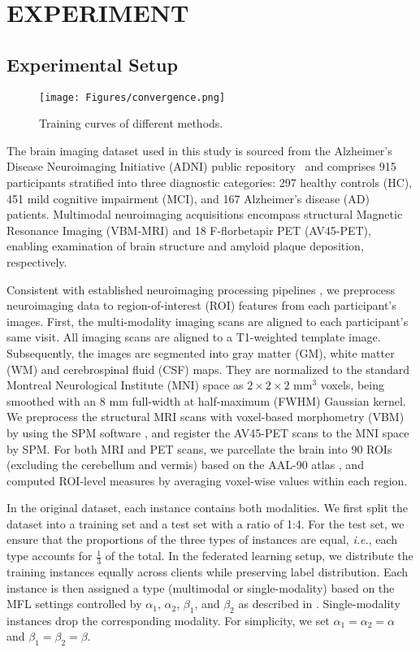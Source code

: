 \section{EXPERIMENT}
\subsection{Experimental Setup}

\begin{figure*}[h]
    \centering
    \texttt{[image: Figures/convergence.png]}
    \caption{Training curves of different methods.}
    \label{fig:training curve}
\end{figure*}
The brain imaging dataset used in this study is sourced from the Alzheimer's Disease Neuroimaging Initiative (ADNI) public repository~\cite{mueller2005alzheimer} and comprises 915 participants stratified into three diagnostic categories: 297 healthy controls (HC), 451 mild cognitive impairment (MCI), and 167 Alzheimer's disease (AD) patients. Multimodal neuroimaging acquisitions encompass structural Magnetic Resonance Imaging (VBM-MRI) and 18 F-florbetapir PET (AV45-PET), enabling examination of brain structure and amyloid plaque deposition, respectively.

Consistent with established neuroimaging processing pipelines \cite{barshan2015stage,zhu2010graphene}, we preprocess neuroimaging data to region-of-interest (ROI) features from each participant’s images. 
First, the multi-modality imaging scans are aligned to each participant's same visit. All imaging scans are aligned to a T1-weighted template image. 
Subsequently, the images are segmented into gray matter (GM), white matter (WM) and cerebrospinal fluid (CSF) maps. 
They are normalized to the standard Montreal Neurological Institute (MNI) space as $2 \times 2 \times 2$ mm$^3$ voxels, being smoothed with an $8$ mm full-width at half-maximum (FWHM) Gaussian kernel.
We preprocess the structural MRI scans with voxel-based morphometry (VBM) by using the SPM software \cite{ashburner2000voxel}, and register the AV45-PET scans to the MNI space by SPM. 
For both MRI and PET scans, we parcellate the brain into 90 ROIs (excluding the cerebellum and vermis) based on the AAL-90 atlas \cite{tzourio2002automated}, and computed ROI-level measures by averaging voxel-wise values within each region.

In the original dataset, each instance contains both modalities. We first split the dataset into a training set and a test set with a ratio of 1:4. For the test set, we ensure that the proportions of the three types of instances are equal, \textit{i.e.}, each type accounts for $\frac{1}{3}$ of the total. 
In the federated learning setup, we distribute the training instances equally across clients while preserving label distribution. Each instance is then assigned a type (multimodal or single-modality) based on the MFL settings controlled by $\alpha_1$, $\alpha_2$, $\beta_1$, and $\beta_2$ as described in . Single-modality instances drop the corresponding modality. For simplicity, we set $\alpha_1 = \alpha_2 = \alpha$ and $\beta_1 = \beta_2 = \beta$.

